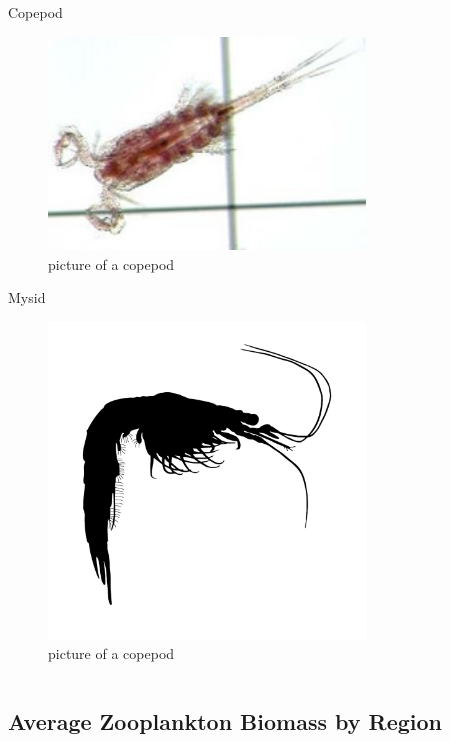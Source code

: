 \documentclass[
]{book}
\begin{document}
\begin{column}{0.3\textwidth}
Copepod

\begin{figure}

{\centering \includegraphics[width=3.31in]{figures/copepod} 

}

\caption{picture of a copepod}\label{fig:unnamed-chunk-24}
\end{figure}

Mysid

\begin{figure}

{\centering \includegraphics[width=3.31in]{figures/mysid} 

}

\caption{picture of a copepod}\label{fig:unnamed-chunk-25}
\end{figure}
\end{column}

\hypertarget{average-zooplankton-biomass-by-region}{%
\subsection{Average Zooplankton Biomass by Region}\label{average-zooplankton-biomass-by-region}}
\end{document}
